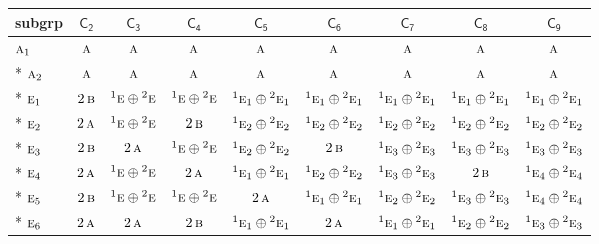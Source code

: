 \documentclass[10pt,a4paper]{article}
\numberwithin{equation}{section}
\newcommand{\grp}[1]{\mathsf{#1}}
\newcommand{\irr}[1]{\text{\normalfont\scshape #1}}
\newcommand{\conjpair}[1]{{}^{#1}}
\begin{document}
{\small\begin{longtable}{@{}lcccccccc@{}}\toprule
subgrp & \href{C2.pdf}{$\grp{C_{2}}$} & \href{C3.pdf}{$\grp{C_{3}}$} & \href{C4.pdf}{$\grp{C_{4}}$} & \href{C5.pdf}{$\grp{C_{5}}$} & \href{C6.pdf}{$\grp{C_{6}}$} & \href{C7.pdf}{$\grp{C_{7}}$} & \href{C8.pdf}{$\grp{C_{8}}$} & \href{C9.pdf}{$\grp{C_{9}}$}\\\midrule\endhead
\bottomrule\endfoot\endlastfoot
$\irr{a}_{1}$ & $\irr{a}$ & $\irr{a}$ & $\irr{a}$ & $\irr{a}$ & $\irr{a}$ & $\irr{a}$ & $\irr{a}$ & $\irr{a}$\\*
$\irr{a}_{2}$ & $\irr{a}$ & $\irr{a}$ & $\irr{a}$ & $\irr{a}$ & $\irr{a}$ & $\irr{a}$ & $\irr{a}$ & $\irr{a}$\\*
$\irr{e}_{1}$ & $2\,\irr{b}$ & $\conjpair{1}\irr{e}\oplus \conjpair{2}\irr{e}$ & $\conjpair{1}\irr{e}\oplus \conjpair{2}\irr{e}$ & $\conjpair{1}\irr{e}_{1}\oplus \conjpair{2}\irr{e}_{1}$ & $\conjpair{1}\irr{e}_{1}\oplus \conjpair{2}\irr{e}_{1}$ & $\conjpair{1}\irr{e}_{1}\oplus \conjpair{2}\irr{e}_{1}$ & $\conjpair{1}\irr{e}_{1}\oplus \conjpair{2}\irr{e}_{1}$ & $\conjpair{1}\irr{e}_{1}\oplus \conjpair{2}\irr{e}_{1}$\\*
$\irr{e}_{2}$ & $2\,\irr{a}$ & $\conjpair{1}\irr{e}\oplus \conjpair{2}\irr{e}$ & $2\,\irr{b}$ & $\conjpair{1}\irr{e}_{2}\oplus \conjpair{2}\irr{e}_{2}$ & $\conjpair{1}\irr{e}_{2}\oplus \conjpair{2}\irr{e}_{2}$ & $\conjpair{1}\irr{e}_{2}\oplus \conjpair{2}\irr{e}_{2}$ & $\conjpair{1}\irr{e}_{2}\oplus \conjpair{2}\irr{e}_{2}$ & $\conjpair{1}\irr{e}_{2}\oplus \conjpair{2}\irr{e}_{2}$\\*
$\irr{e}_{3}$ & $2\,\irr{b}$ & $2\,\irr{a}$ & $\conjpair{1}\irr{e}\oplus \conjpair{2}\irr{e}$ & $\conjpair{1}\irr{e}_{2}\oplus \conjpair{2}\irr{e}_{2}$ & $2\,\irr{b}$ & $\conjpair{1}\irr{e}_{3}\oplus \conjpair{2}\irr{e}_{3}$ & $\conjpair{1}\irr{e}_{3}\oplus \conjpair{2}\irr{e}_{3}$ & $\conjpair{1}\irr{e}_{3}\oplus \conjpair{2}\irr{e}_{3}$\\*
$\irr{e}_{4}$ & $2\,\irr{a}$ & $\conjpair{1}\irr{e}\oplus \conjpair{2}\irr{e}$ & $2\,\irr{a}$ & $\conjpair{1}\irr{e}_{1}\oplus \conjpair{2}\irr{e}_{1}$ & $\conjpair{1}\irr{e}_{2}\oplus \conjpair{2}\irr{e}_{2}$ & $\conjpair{1}\irr{e}_{3}\oplus \conjpair{2}\irr{e}_{3}$ & $2\,\irr{b}$ & $\conjpair{1}\irr{e}_{4}\oplus \conjpair{2}\irr{e}_{4}$\\*
$\irr{e}_{5}$ & $2\,\irr{b}$ & $\conjpair{1}\irr{e}\oplus \conjpair{2}\irr{e}$ & $\conjpair{1}\irr{e}\oplus \conjpair{2}\irr{e}$ & $2\,\irr{a}$ & $\conjpair{1}\irr{e}_{1}\oplus \conjpair{2}\irr{e}_{1}$ & $\conjpair{1}\irr{e}_{2}\oplus \conjpair{2}\irr{e}_{2}$ & $\conjpair{1}\irr{e}_{3}\oplus \conjpair{2}\irr{e}_{3}$ & $\conjpair{1}\irr{e}_{4}\oplus \conjpair{2}\irr{e}_{4}$\\*
$\irr{e}_{6}$ & $2\,\irr{a}$ & $2\,\irr{a}$ & $2\,\irr{b}$ & $\conjpair{1}\irr{e}_{1}\oplus \conjpair{2}\irr{e}_{1}$ & $2\,\irr{a}$ & $\conjpair{1}\irr{e}_{1}\oplus \conjpair{2}\irr{e}_{1}$ & $\conjpair{1}\irr{e}_{2}\oplus \conjpair{2}\irr{e}_{2}$ & $\conjpair{1}\irr{e}_{3}\oplus \conjpair{2}\irr{e}_{3}$\\
\bottomrule\end{longtable}}
\end{document}
